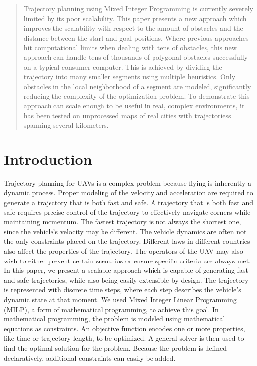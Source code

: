 \begin{abstract}
Trajectory planning using Mixed Integer Programming is currently severely limited by its poor scalability. This paper presents a new approach which improves the scalability with respect to the amount of obstacles and the distance between the start and goal positions. Where previous approaches hit computational limits when dealing with tens of obstacles, this new approach can handle tens of thousands of polygonal obstacles successfully on a typical consumer computer. 
This is achieved by dividing the trajectory into many smaller segments using multiple heuristics. Only obstacles in the local neighborhood of a segment are modeled, significantly reducing the complexity of the optimization problem. To demonstrate this approach can scale enough to be useful in real, complex environments, it has been tested on unprocessed maps of real cities with trajectoriess spanning several kilometers.
\end{abstract}

\section{Introduction}
Trajectory planning for UAVs is a complex problem because flying is inherently a dynamic process. Proper modeling of the velocity and acceleration are required to generate a trajectory that is both fast and safe. A trajectory that is both fast and safe requires precise control of the trajectory to effectively navigate corners while maintaining momentum. The fastest trajectory is not always the shortest one, since the vehicle's velocity may be different. The vehicle dynamics are often not the only constraints placed on the trajectory. Different laws in different countries also affect the properties of the trajectory. The operators of the UAV may also wish to either prevent certain scenarios or ensure specific criteria are always met. \\
In this paper, we present a scalable approach which is capable of generating fast and safe trajectories, while also being easily extensible by design. The trajectory is represented with discrete time steps, where each step describes the vehicle's dynamic state at that moment. We used Mixed Integer Linear Programming (MILP), a form of mathematical programming, to achieve this goal. In mathematical programming, the problem is modeled using mathematical equations as constraints. An objective function encodes one or more properties, like time or trajectory length, to be optimized. A general solver is then used to find the optimal solution for the problem. Because the problem is defined declaratively, additional constraints can easily be added.\\


